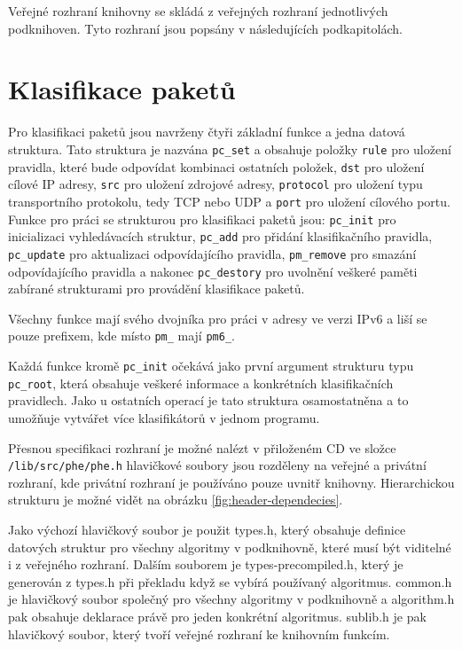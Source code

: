 Veřejné rozhraní knihovny se skládá z veřejných rozhraní jednotlivých podknihoven.
Tyto rozhraní jsou popsány v následujících podkapitolách.

\section{Klasifikace paketů} %

Pro klasifikaci paketů jsou navrženy čtyři základní funkce a jedna datová struktura.
Tato struktura je nazvána \texttt{pc\_set} a obsahuje položky \texttt{rule} pro uložení pravidla,
které bude odpovídat kombinaci ostatních položek, \texttt{dst} pro uložení cílové IP adresy,
\texttt{src} pro uložení zdrojové adresy, \texttt{protocol} pro uložení typu transportního protokolu,
tedy TCP nebo UDP a \texttt{port} pro uložení cílového portu.
Funkce pro práci se strukturou pro klasifikaci paketů jsou: \texttt{pc\_init} pro inicializaci
vyhledávacích struktur, \texttt{pc\_add} pro přidání klasifikačního pravidla, \texttt{pc\_update}
pro aktualizaci odpovídajícího pravidla, \texttt{pm\_remove} pro smazání odpovídajícího pravidla
a nakonec \texttt{pc\_destory} pro uvolnění veškeré paměti zabírané strukturami pro provádění klasifikace
paketů.

Všechny funkce mají svého dvojníka pro práci v adresy ve verzi IPv6 a liší se pouze prefixem,
kde místo \texttt{pm\_} mají \texttt{pm6\_}.

Každá funkce kromě \texttt{pc\_init} očekává jako první argument strukturu typu \texttt{pc\_root},
která obsahuje veškeré informace a konkrétních klasifikačních pravidlech. Jako u ostatních operací
je tato struktura osamostatněna a to umožňuje vytvářet více klasifikátorů v jednom programu.

Přesnou specifikaci rozhraní je možné nalézt v přiloženém CD ve složce \texttt{/lib/src/phe/phe.h}
hlavičkové soubory jsou rozděleny na veřejné a privátní rozhraní, kde privátní rozhraní je používáno pouze uvnitř knihovny. Hierarchickou strukturu je možné vidět na obrázku \ref{fig:header-dependecies}.

Jako výchozí hlavičkový soubor je použit types.h, který obsahuje definice datových struktur pro všechny algoritmy v podknihovně, které musí být viditelné i z veřejného rozhraní. Dalším souborem je types-precompiled.h, který je generován z types.h při překladu když se vybírá používaný algoritmus. common.h je hlavičkový soubor společný pro všechny algoritmy v podknihovně a algorithm.h pak obsahuje deklarace právě pro jeden konkrétní algoritmus.
sublib.h je pak hlavičkový soubor, který tvoří veřejné rozhraní ke knihovním funkcím.

